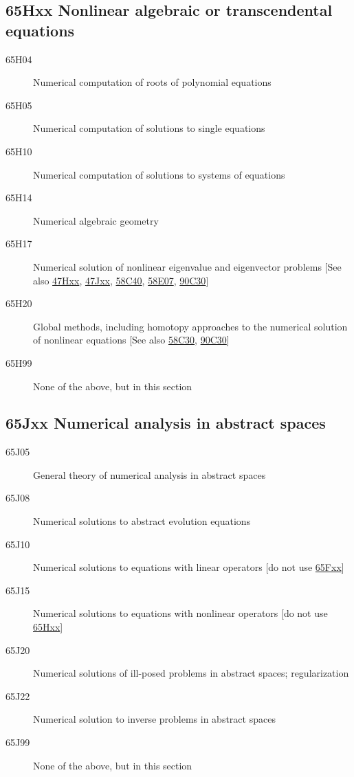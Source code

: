 \documentclass[letterpaper]{article}
\begin{document}
\subsection*{65Hxx  Nonlinear algebraic or transcendental equations }\label{65Hxx}
\begin{description}  
\item [65H04]\label{65H04} Numerical computation of roots of polynomial equations
\item [65H05]\label{65H05} Numerical computation of solutions to single equations
\item [65H10]\label{65H10} Numerical computation of solutions to systems of equations
\item [65H14]\label{65H14} Numerical algebraic geometry
\item [65H17]\label{65H17} Numerical solution of nonlinear eigenvalue and eigenvector problems [See also \hyperref[47Hxx]{47Hxx}, \hyperref[47Jxx]{47Jxx}, \hyperref[58C40]{58C40}, \hyperref[58E07]{58E07}, \hyperref[90C30]{90C30}]
\item [65H20]\label{65H20} Global methods, including homotopy approaches to the numerical solution of nonlinear equations [See also \hyperref[58C30]{58C30}, \hyperref[90C30]{90C30}]
\item [65H99]\label{65H99} None of the above, but in this section
\end{description}
\subsection*{65Jxx  Numerical analysis in abstract spaces }\label{65Jxx}
\begin{description}  
\item [65J05]\label{65J05} General theory of numerical analysis in abstract spaces
\item [65J08]\label{65J08} Numerical solutions to abstract evolution equations
\item [65J10]\label{65J10} Numerical solutions to equations with linear operators [do not use \hyperref[65Fxx]{65Fxx}]
\item [65J15]\label{65J15} Numerical solutions to equations with nonlinear operators [do not use \hyperref[65Hxx]{65Hxx}]
\item [65J20]\label{65J20} Numerical solutions of ill-posed problems in abstract spaces; regularization
\item [65J22]\label{65J22} Numerical solution to inverse problems in abstract spaces
\item [65J99]\label{65J99} None of the above, but in this section
\end{description}
\end{document}
